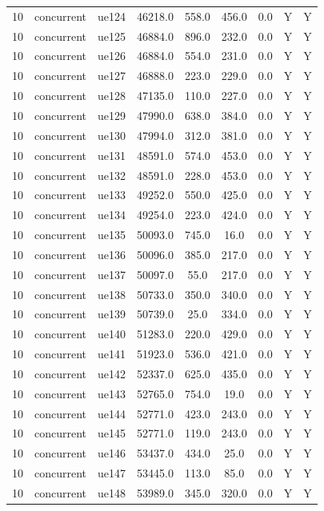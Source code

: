 \begin{table}[ht]
\begin{tabular}{|c|c|c|c|c|c|c|c|c|}
10 & concurrent & ue124 & 46218.0 & 558.0 & 456.0 & 0.0 & Y & Y \\
10 & concurrent & ue125 & 46884.0 & 896.0 & 232.0 & 0.0 & Y & Y \\
10 & concurrent & ue126 & 46884.0 & 554.0 & 231.0 & 0.0 & Y & Y \\
10 & concurrent & ue127 & 46888.0 & 223.0 & 229.0 & 0.0 & Y & Y \\
10 & concurrent & ue128 & 47135.0 & 110.0 & 227.0 & 0.0 & Y & Y \\
10 & concurrent & ue129 & 47990.0 & 638.0 & 384.0 & 0.0 & Y & Y \\
10 & concurrent & ue130 & 47994.0 & 312.0 & 381.0 & 0.0 & Y & Y \\
10 & concurrent & ue131 & 48591.0 & 574.0 & 453.0 & 0.0 & Y & Y \\
10 & concurrent & ue132 & 48591.0 & 228.0 & 453.0 & 0.0 & Y & Y \\
10 & concurrent & ue133 & 49252.0 & 550.0 & 425.0 & 0.0 & Y & Y \\
10 & concurrent & ue134 & 49254.0 & 223.0 & 424.0 & 0.0 & Y & Y \\
10 & concurrent & ue135 & 50093.0 & 745.0 & 16.0 & 0.0 & Y & Y \\
10 & concurrent & ue136 & 50096.0 & 385.0 & 217.0 & 0.0 & Y & Y \\
10 & concurrent & ue137 & 50097.0 & 55.0 & 217.0 & 0.0 & Y & Y \\
10 & concurrent & ue138 & 50733.0 & 350.0 & 340.0 & 0.0 & Y & Y \\
10 & concurrent & ue139 & 50739.0 & 25.0 & 334.0 & 0.0 & Y & Y \\
10 & concurrent & ue140 & 51283.0 & 220.0 & 429.0 & 0.0 & Y & Y \\
10 & concurrent & ue141 & 51923.0 & 536.0 & 421.0 & 0.0 & Y & Y \\
10 & concurrent & ue142 & 52337.0 & 625.0 & 435.0 & 0.0 & Y & Y \\
10 & concurrent & ue143 & 52765.0 & 754.0 & 19.0 & 0.0 & Y & Y \\
10 & concurrent & ue144 & 52771.0 & 423.0 & 243.0 & 0.0 & Y & Y \\
10 & concurrent & ue145 & 52771.0 & 119.0 & 243.0 & 0.0 & Y & Y \\
10 & concurrent & ue146 & 53437.0 & 434.0 & 25.0 & 0.0 & Y & Y \\
10 & concurrent & ue147 & 53445.0 & 113.0 & 85.0 & 0.0 & Y & Y \\
10 & concurrent & ue148 & 53989.0 & 345.0 & 320.0 & 0.0 & Y & Y \\

\end{tabular}
\end{table}
